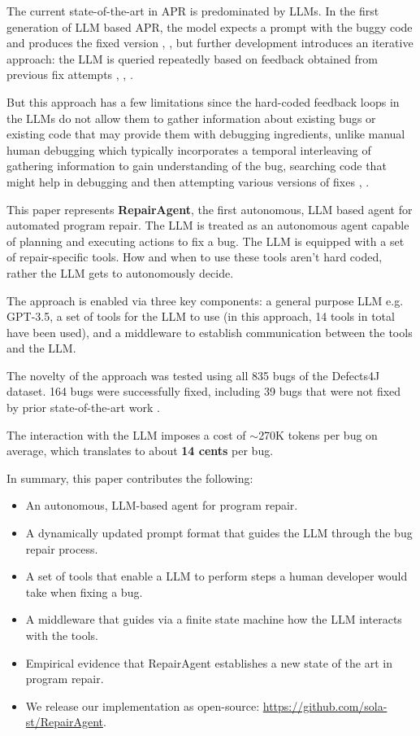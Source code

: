 \documentclass[manuscript,review]{acmart}
\begin{document}
The current state-of-the-art in APR is predominated by LLMs. In the first generation of LLM based APR, the model expects a prompt with the buggy code and produces the fixed version \cite{xia2023automated}, \cite{jiang2023impact}, but further development introduces an iterative approach: the LLM is queried repeatedly based on feedback obtained from previous fix attempts \cite{xia2023keep}, \cite{kang2023explainable}, \cite{ye2024iter}.

But this approach has a few limitations since the hard-coded feedback loops in the LLMs do not allow them to gather information about existing bugs or existing code that may provide them with debugging ingredients, unlike manual human debugging which typically incorporates a temporal interleaving of gathering information to gain understanding of the bug, searching code that might help in debugging and then attempting various versions of fixes \cite{ko2006exploratory}, \cite{bohme2017where}.

This paper represents \textbf{RepairAgent}, the first autonomous, LLM based agent for automated program repair. The LLM is treated as an autonomous agent capable of planning and executing actions to fix a bug. The LLM is equipped with a set of repair-specific tools. How and when to use these tools aren't hard coded, rather the LLM gets to autonomously decide. 

The approach is enabled via three key components: a general purpose LLM e.g. GPT-3.5, a set of tools for the LLM to use (in this approach, 14 tools in total have been used), and a middleware to establish communication between the tools and the LLM.

The novelty of the approach was tested using all 835 bugs of the Defects4J \cite{just2014defects4j} dataset. 164 bugs were successfully fixed, including 39 bugs that were not fixed by prior state-of-the-art work \cite{xia2023keep} \cite{ye2024iter}. 

The interaction with the LLM imposes a cost of $\sim$270K tokens per bug on average, which translates to about \textbf{14 cents} per bug. 

In summary, this paper contributes the following:
\begin{itemize}
  \item An autonomous, LLM-based agent for program repair.
  \item A dynamically updated prompt format that guides the LLM through the bug repair process.
  \item A set of tools that enable a LLM to perform steps a human developer would take when fixing a bug.
  \item A middleware that guides via a finite state machine how the LLM interacts with the tools.
  \item Empirical evidence that RepairAgent establishes a new state of the art in program repair.
  \item We release our implementation as open-source: \url{https://github.com/sola-st/RepairAgent}.
\end{itemize}
\end{document}
